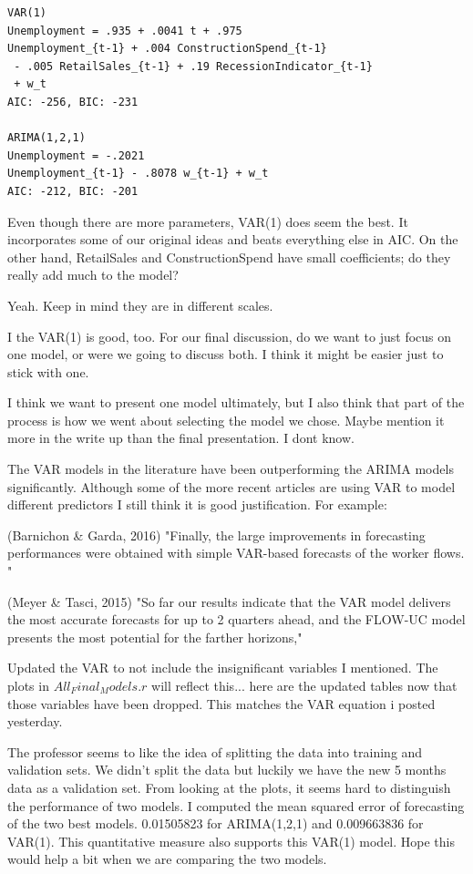 \documentclass[twoside,twocolumn]{article}
\begin{document}
\begin{verbatim}
VAR(1)
Unemployment = .935 + .0041 t + .975 
Unemployment_{t-1} + .004 ConstructionSpend_{t-1}
 - .005 RetailSales_{t-1} + .19 RecessionIndicator_{t-1}
 + w_t
AIC: -256, BIC: -231

ARIMA(1,2,1)
Unemployment = -.2021 
Unemployment_{t-1} - .8078 w_{t-1} + w_t
AIC: -212, BIC: -201
\end{verbatim}

Even though there are more parameters, VAR(1) does seem the best. It incorporates some of our original ideas and beats everything else in AIC. On the other hand, RetailSales and ConstructionSpend have small coefficients; do they really add much to the model?

Yeah. Keep in mind they are in different scales.

I the VAR(1) is good, too. For our final discussion, do we want to just focus on one model, or were we going to discuss both. I think it might be easier just to stick with one.

I think we want to present one model ultimately, but I also think that part of the process is how we went about selecting the model we chose. Maybe mention it more in the write up than the final presentation. I dont know.



The VAR models in the literature have been outperforming the ARIMA models significantly. Although some of the more recent articles are using VAR to model different predictors I still think it is good justification. For example:

(Barnichon \& Garda, 2016)
"Finally, the large improvements in forecasting performances were obtained with simple VAR-based forecasts of the worker flows. "

(Meyer \& Tasci, 2015)
"So far our results indicate that the VAR model delivers the most accurate forecasts for up to 2 quarters ahead, and the FLOW-UC model presents the most potential for the farther
horizons,"

Updated the VAR to not include the insignificant variables I mentioned. The plots in \(All_Final_Models.r\) will reflect this... here are the updated tables now that those variables have been dropped. This matches the VAR equation i posted yesterday.

The professor seems to like the idea of splitting the data into training and validation sets. We didn't split the data but luckily we have the new 5 months data as a validation set. From looking at the plots, it seems hard to distinguish the performance of two models. I computed the mean squared error of forecasting of the two best models. 0.01505823 for ARIMA(1,2,1) and 0.009663836 for VAR(1). This quantitative measure also supports this VAR(1) model. Hope this would help a bit when we are comparing the two models. 
 
\end{document}
